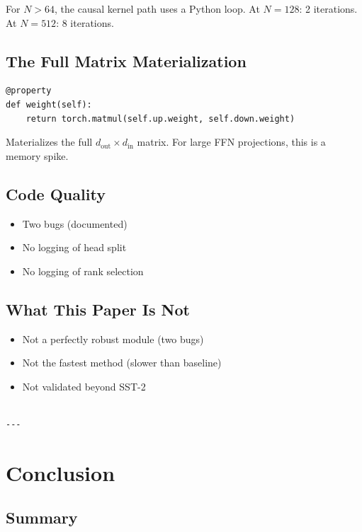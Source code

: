 For $N > 64$, the causal kernel path uses a Python loop. At $N = 128$: 2 
iterations. At $N = 512$: 8 iterations.

\subsection{The Full Matrix Materialization}

\begin{lstlisting}
@property
def weight(self):
    return torch.matmul(self.up.weight, self.down.weight)
\end{lstlisting}

Materializes the full $d_\text{out} \times d_\text{in}$ matrix. For large 
FFN projections, this is a memory spike.

\subsection{Code Quality}

\begin{itemize}
\item Two bugs (documented)
\item No logging of head split
\item No logging of rank selection

\end{itemize}
\subsection{What This Paper Is Not}

\begin{itemize}
\item Not a perfectly robust module (two bugs)
\item Not the fastest method (slower than baseline)
\item Not validated beyond SST-2
\end{itemize}
\begin{lstlisting}

---
\end{lstlisting}


\section{Conclusion}

\subsection{Summary}


